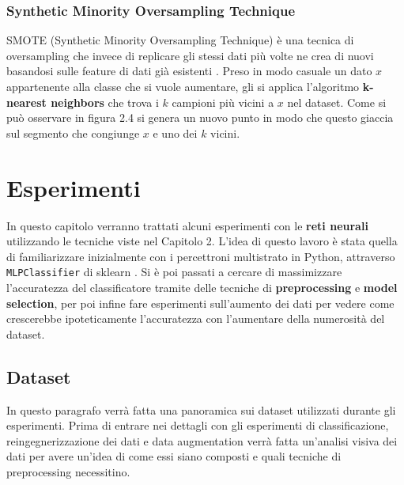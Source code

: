 \documentclass[12pt, twoside, letterpaper]{report}
\begin{document}
			\subsection{Synthetic Minority Oversampling Technique} \label{sec:smote}
				SMOTE (Synthetic Minority Oversampling Technique) è una tecnica di oversampling che invece di replicare gli stessi dati più volte ne crea di nuovi basandosi sulle feature di dati già esistenti \cite{smote}. Preso in modo casuale un dato $x$ appartenente alla classe che si vuole aumentare, gli si applica l'algoritmo \textbf{k-nearest neighbors} che trova i $k$ campioni più vicini a $x$ nel dataset. Come si può osservare in figura 2.4 si genera un nuovo punto in modo che questo giaccia sul segmento che congiunge $x$ e uno dei $k$ vicini. %


	\chapter{Esperimenti} \label{chap:esperimenti}
		In questo capitolo verranno trattati alcuni esperimenti con le \textbf{reti neurali} utilizzando le tecniche viste nel Capitolo 2. L'idea di questo lavoro è stata quella di familiarizzare inizialmente con i percettroni multistrato in Python, attraverso \texttt{MLPClassifier} di sklearn \cite{sklearn}. Si è poi passati a cercare di massimizzare l'accuratezza del classificatore tramite delle tecniche di \textbf{preprocessing} e \textbf{model selection}, per poi infine fare esperimenti sull'aumento dei dati per vedere come crescerebbe ipoteticamente l'accuratezza con l'aumentare della numerosità del dataset.
	
	\section{Dataset} 
		In questo paragrafo verrà fatta una panoramica sui dataset utilizzati durante gli esperimenti. Prima di entrare nei dettagli con gli esperimenti di classificazione, reingegnerizzazione dei dati e data augmentation verrà fatta un'analisi visiva dei dati per avere un'idea di come essi siano composti e quali tecniche di preprocessing necessitino.
		\begin{table}
			\noindent{}
			\caption{\label{tab:iris}Tre misurazioni appartenenti all'iris dataset.}
		\end{table}
			
\end{document}
